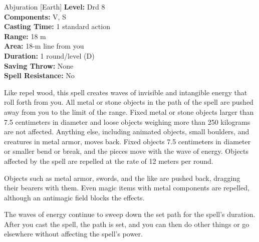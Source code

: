 {Abjuration [Earth]}
{
	\textbf{Level:}
	Drd 8\\
	\textbf{Components:}
	V, S\\
	\textbf{Casting Time:}
	1 standard action\\
	\textbf{Range:}
	18 m\\
	\textbf{Area:}
	18-m line from you\\
	\textbf{Duration:}
	1 round/level (D)\\
	\textbf{Saving Throw:}
	None\\
	\textbf{Spell Resistance:}
	No\\
}
{
	Like repel wood, this spell creates waves of invisible and intangible energy that roll forth from you. All metal or stone objects in the path of the spell are pushed away from you to the limit of the range. Fixed metal or stone objects larger than 7.5 centimeters in diameter and loose objects weighing more than 250 kilograms are not affected. Anything else, including animated objects, small boulders, and creatures in metal armor, moves back. Fixed objects 7.5 centimeters in diameter or smaller bend or break, and the pieces move with the wave of energy. Objects affected by the spell are repelled at the rate of 12 meters per round.

	Objects such as metal armor, swords, and the like are pushed back, dragging their bearers with them. Even magic items with metal components are repelled, although an antimagic field blocks the effects.

	The waves of energy continue to sweep down the set path for the spell's duration. After you cast the spell, the path is set, and you can then do other things or go elsewhere without affecting the spell's power.

}
